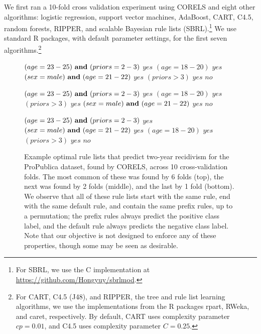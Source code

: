 We first ran a 10-fold cross validation experiment using CORELS
and eight other algorithms:
logistic regression, support vector machines, AdaBoost, CART, C4.5,
random forests, RIPPER, and scalable Bayesian rule lists (SBRL).\footnote{For
SBRL, we use the C implementation at \url{https://github.com/Hongyuy/sbrlmod}.}
%
We use standard R packages, with default parameter settings,
for the first seven algorithms.\footnote{For CART, C4.5 (J48), and RIPPER,
\ie the tree and rule list learning algorithms, we use the implementations
from the R packages rpart, RWeka, and caret, respectively.
%
By default, CART uses complexity parameter ${cp = 0.01}$,
and C4.5 uses complexity parameter ${C = 0.25}$.
}

\begin{figure}[t]
\begin{algorithmic}
\State \bif $(age = 23-25) {\bf ~and~} (priors = 2-3)$ \bthen $yes$
\State \belif $(age = 18-20)$ \bthen $yes$
\State \belif $(sex = male) {\bf ~and~} (age = 21-22)$ \bthen $yes$
\State \belif $(priors > 3)$ \bthen $yes$
\State \belse $no$
\end{algorithmic}
\vspace{1mm}
\begin{algorithmic}
\State \bif $(age = 23-25) {\bf ~and~} (priors = 2-3)$ \bthen $yes$
\State \belif $(age = 18-20)$ \bthen $yes$
\State \belif $(priors > 3)$ \bthen $yes$
\State \belif $(sex = male) {\bf ~and~} (age = 21-22)$ \bthen $yes$
\State \belse $no$
\end{algorithmic}
\vspace{1mm}
\begin{algorithmic}
\State \bif $(age = 23-25) {\bf ~and~} (priors = 2-3)$ \bthen $yes$
\State \belif $(sex = male) {\bf ~and~} (age = 21-22)$ \bthen $yes$
\State \belif $(age = 18-20)$ \bthen $yes$
\State \belif $(priors > 3)$ \bthen $yes$
\State \belse $no$
\end{algorithmic}
\caption{Example optimal rule lists that predict two-year recidivism for the
ProPublica dataset, found by CORELS, across 10 cross-validation folds.
%
The most common of these was found by 6 folds (top),
the next was found by 2 folds (middle), and the last by 1 fold (bottom).
%
We observe that all of these rule lists start with the same rule,
end with the same default rule, and contain the same prefix rules, up to a permutation;
the prefix rules always predict the positive class label,
and the default rule always predicts the negative class label.
%
Note that our objective is not designed to enforce any of these properties,
though some may be seen as desirable.
}
\label{fig:recidivism-all-folds}
\end{figure}

